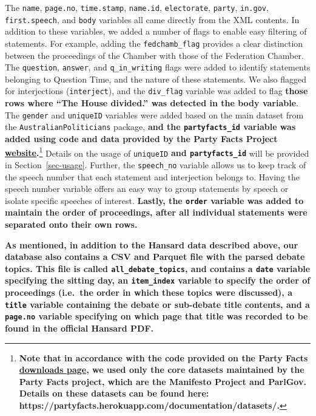 \documentclass[
  letterpaper,
  DIV=11,
  numbers=noendperiod]{scrartcl}
\begin{document}
The \texttt{name}, \texttt{page.no}, \texttt{time.stamp},
\texttt{name.id}, \texttt{electorate}, \texttt{party}, \texttt{in.gov},
\texttt{first.speech}, and \texttt{body} variables all came directly
from the XML contents. In addition to these variables, we added a number
of flags to enable easy filtering of statements. For example, adding the
\texttt{fedchamb\_flag} provides a clear distinction between the
proceedings of the Chamber with those of the Federation Chamber. The
\texttt{question}, \texttt{answer}, and \texttt{q\_in\_writing} flags
were added to identify statements belonging to Question Time, and the
nature of these statements. We also flagged for interjections
(\texttt{interject}), and the \texttt{div\_flag} variable was added to
flag \textbf{those rows where ``The House divided.'' was detected in the
body variable}. The \texttt{gender} and \texttt{uniqueID} variables were
added based on the main dataset from the \texttt{AustralianPoliticians}
package, \textbf{and the \texttt{partyfacts\_id} variable was added
using code and data provided by the Party Facts Project
\href{https://partyfacts.herokuapp.com}{website}.}\footnote{\textbf{Note
  that in accordance with the code provided on the Party Facts
  \href{https://partyfacts.herokuapp.com/download/}{downloads page}, we
  used only the core datasets maintained by the Party Facts project,
  which are the Manifesto Project and ParlGov. Details on these datasets
  can be found here:
  https://partyfacts.herokuapp.com/documentation/datasets/.}} Details on
the usage of \texttt{uniqueID} \textbf{and \texttt{partyfacts\_id}} will
be provided in Section~\ref{sec-usage}. Further, the \texttt{speech\_no}
variable allows us to keep track of the speech number that each
statement and interjection belongs to. Having the speech number variable
offers an easy way to group statements by speech or isolate specific
speeches of interest. \textbf{Lastly, the \texttt{order} variable was
added to maintain the order of proceedings, after all individual
statements were separated onto their own rows.}

\textbf{As mentioned, in addition to the Hansard data described above,
our database also contains a CSV and Parquet file with the parsed debate
topics. This file is called \texttt{all\_debate\_topics}, and contains a
\texttt{date} variable specifying the sitting day, an
\texttt{item\_index} variable to specify the order of proceedings
(i.e.~the order in which these topics were discussed), a \texttt{title}
variable containing the debate or sub-debate title contents, and a
\texttt{page.no} variable specifying on which page that title was
recorded to be found in the official Hansard PDF.}
\end{document}
